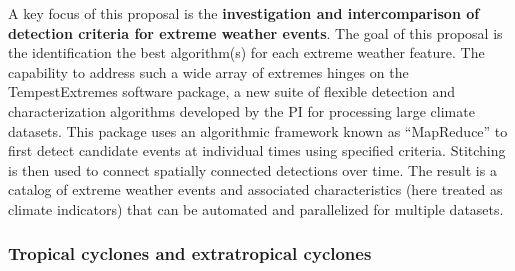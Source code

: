 \documentclass[11pt]{article}
\newcommand\citep{\cite}
\newcommand\citet{\cite}
\begin{document}
A key focus of this proposal is the \textbf{investigation and intercomparison of detection criteria for extreme weather events}.  The goal of this proposal is the identification the best algorithm(s) for each extreme weather feature.  The capability to address such a wide array of extremes hinges on the TempestExtremes software package, a new suite of flexible detection and characterization algorithms developed by the PI for processing large climate datasets. This package uses an algorithmic framework known as ``MapReduce'' to first detect candidate events at individual times using specified criteria. Stitching is then used to connect spatially connected detections over time. The result is a catalog of extreme weather events and associated characteristics (here treated as climate indicators) that can be automated and parallelized for multiple datasets.

\subsubsection{Tropical cyclones and extratropical cyclones}


\end{document}
